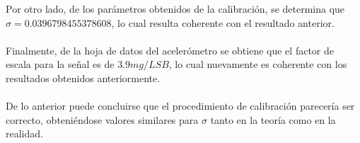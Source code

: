 \documentclass[spanish,12pt,a4paper,titlepage]{report}
\begin{document}
Por otro lado, de los parámetros obtenidos de la calibración, se determina que $\sigma= 0.0396798455378608$, lo cual resulta coherente con el resultado anterior.\\
\\
Finalmente, de la hoja de datos del acelerómetro se obtiene que el factor de escala para la señal es de $3.9 mg/LSB$, lo cual nuevamente es coherente con los resultados obtenidos anteriormente.\\
\\
De lo anterior puede concluirse que el procedimiento de calibración parecería ser correcto, obteniéndose valores similares para $\sigma$ tanto en la teoría como en la realidad.
\end{document}
